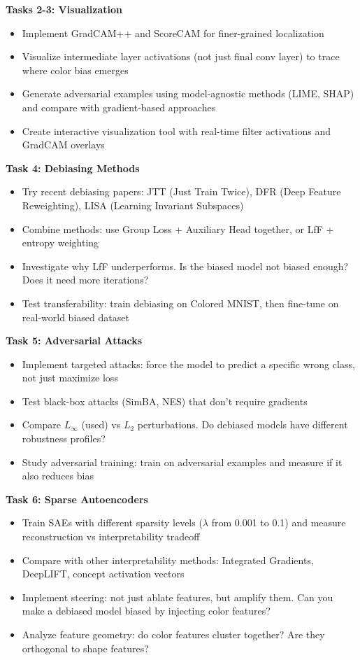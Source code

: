 \documentclass[9pt,a4paper,twocolumn,twoside]{tau-class/tau}
\begin{document}
        \textbf{Tasks 2-3: Visualization}
        \begin{itemize}
            \item Implement GradCAM++ and ScoreCAM for finer-grained localization
            \item Visualize intermediate layer activations (not just final conv layer) to trace where color bias emerges
            \item Generate adversarial examples using model-agnostic methods (LIME, SHAP) and compare with gradient-based approaches
            \item Create interactive visualization tool with real-time filter activations and GradCAM overlays
        \end{itemize}

        \textbf{Task 4: Debiasing Methods}
        \begin{itemize}
            \item Try recent debiasing papers: JTT (Just Train Twice), DFR (Deep Feature Reweighting), LISA (Learning Invariant Subspaces)
            \item Combine methods: use Group Loss + Auxiliary Head together, or LfF + entropy weighting
            \item Investigate why LfF underperforms. Is the biased model not biased enough? Does it need more iterations?
            \item Test transferability: train debiasing on Colored MNIST, then fine-tune on real-world biased dataset
        \end{itemize}

        \textbf{Task 5: Adversarial Attacks}
        \begin{itemize}
            \item Implement targeted attacks: force the model to predict a specific wrong class, not just maximize loss
            \item Test black-box attacks (SimBA, NES) that don't require gradients
            \item Compare $L_\infty$ (used) vs $L_2$ perturbations. Do debiased models have different robustness profiles?
            \item Study adversarial training: train on adversarial examples and measure if it also reduces bias
        \end{itemize}
    
        \textbf{Task 6: Sparse Autoencoders}
        \begin{itemize}
            \item Train SAEs with different sparsity levels ($\lambda$ from 0.001 to 0.1) and measure reconstruction vs interpretability tradeoff
            \item Compare with other interpretability methods: Integrated Gradients, DeepLIFT, concept activation vectors
            \item Implement steering: not just ablate features, but amplify them. Can you make a debiased model biased by injecting color features?
            \item Analyze feature geometry: do color features cluster together? Are they orthogonal to shape features?
        \end{itemize}
\end{document}
